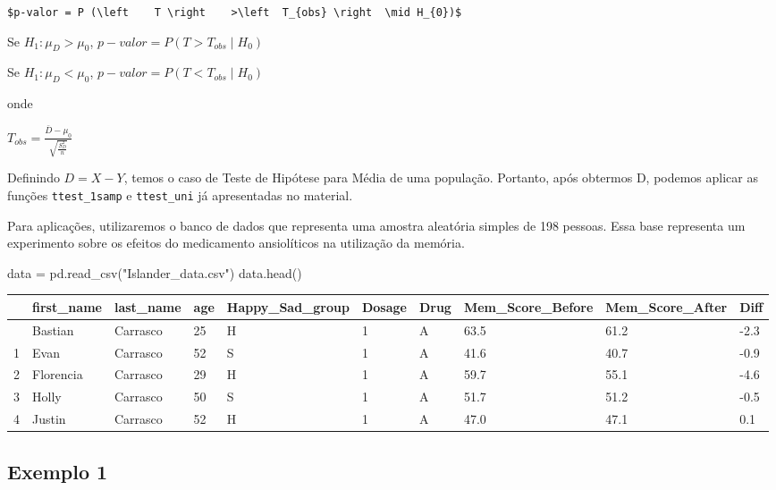 \documentclass[
  letterpaper,
  DIV=11,
  numbers=noendperiod]{scrreprt}
\newenvironment{Shaded}{\begin{snugshade}}{\end{snugshade}}
\newcommand{\NormalTok}[1]{\textcolor[rgb]{0.00,0.23,0.31}{#1}}
\newcommand{\OperatorTok}[1]{\textcolor[rgb]{0.37,0.37,0.37}{#1}}
\newcommand{\StringTok}[1]{\textcolor[rgb]{0.13,0.47,0.30}{#1}}
\begin{document}
\texttt{\$p-valor\ =\ P\ (\textbackslash{}left\ \ \ \ T\ \textbackslash{}right\ \ \ \ \textgreater{}\textbackslash{}left\ \ T\_\{obs\}\ \textbackslash{}right\ \ \textbackslash{}mid\ H\_\{0\})\$}

Se \(H_{1}: \mu_{D} > \mu_{0}\), \(p-valor = P (T > T_{obs}\mid H_{0})\)

Se \(H_{1}: \mu_{D} < \mu_{0}\), \(p-valor = P (T < T_{obs}\mid H_{0})\)

onde

\(T_{obs}= \frac{\bar{D} - \mu_{0}}{\sqrt{\frac{S^2_{D}}{n}}}\)

Definindo \({D = X - Y}\), temos o caso de Teste de Hipótese para Média
de uma população. Portanto, após obtermos D, podemos aplicar as funções
\texttt{ttest\_1samp} e \texttt{ttest\_uni} já apresentadas no material.

Para aplicações, utilizaremos o banco de dados que representa uma
amostra aleatória simples de 198 pessoas. Essa base representa um
experimento sobre os efeitos do medicamento ansiolíticos na utilização
da memória.

\begin{Shaded}
\begin{Highlighting}[]
\NormalTok{data }\OperatorTok{=}\NormalTok{ pd.read\_csv(}\StringTok{"Islander\_data.csv"}\NormalTok{)}
\NormalTok{data.head()}
\end{Highlighting}
\end{Shaded}

\begin{longtable}[]{@{}llllllllll@{}}
\toprule\noalign{}
& first\_name & last\_name & age & Happy\_Sad\_group & Dosage & Drug &
Mem\_Score\_Before & Mem\_Score\_After & Diff \\
\midrule\noalign{}
\endhead
\bottomrule\noalign{}
\endlastfoot
0 & Bastian & Carrasco & 25 & H & 1 & A & 63.5 & 61.2 & -2.3 \\
1 & Evan & Carrasco & 52 & S & 1 & A & 41.6 & 40.7 & -0.9 \\
2 & Florencia & Carrasco & 29 & H & 1 & A & 59.7 & 55.1 & -4.6 \\
3 & Holly & Carrasco & 50 & S & 1 & A & 51.7 & 51.2 & -0.5 \\
4 & Justin & Carrasco & 52 & H & 1 & A & 47.0 & 47.1 & 0.1 \\
\end{longtable}

\hypertarget{exemplo-1-5}{%
\subsection{Exemplo 1}\label{exemplo-1-5}}
\end{document}
